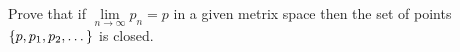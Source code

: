 \begin{problem}
  Prove that if $\lim\limits_{n \to \infty}{p_n} = p$ in a given metrix space
  then the set of points $\left\{p, p_1, p_2, \dots\right\}$ is closed.
\end{problem}
\begin{answer}
  
\end{answer}
